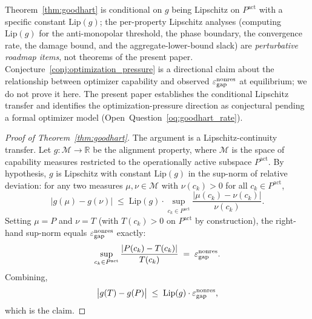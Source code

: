 \begin{remark}
\label{rem:thm2_qualitative}
Theorem~\ref{thm:goodhart} is conditional on $g$ being Lipschitz
on $P^{\mathrm{act}}$ with a specific constant $\mathrm{Lip}(g)$;
the per-property Lipschitz analyses (computing
$\mathrm{Lip}(g)$ for the anti-monopolar threshold, the phase
boundary, the convergence rate, the damage bound, and the
aggregate-lower-bound slack) are
\emph{perturbative roadmap items}, not theorems of the present
paper.  Conjecture~\ref{conj:optimization_pressure} is a
directional claim about the relationship between optimizer
capability and observed $\varepsilon_{\mathrm{gap}}^{\mathrm{nonres}}$ at equilibrium; we do not
prove it here.  The present paper establishes the conditional
Lipschitz transfer and identifies the optimization-pressure
direction as conjectural pending a formal optimizer model
(Open~Question~\ref{oq:goodhart_rate}).
\end{remark}

\begin{proof}[Proof of Theorem~\ref{thm:goodhart}]
The argument is a Lipschitz-continuity transfer.  Let
$g: \mathcal{M} \to \mathbb{R}$ be the alignment property, where
$\mathcal{M}$ is the space of capability measures restricted to
the operationally active subspace $P^{\mathrm{act}}$.  By
hypothesis, $g$ is Lipschitz with constant $\mathrm{Lip}(g)$ in
the sup-norm of relative deviation: for any two measures
$\mu, \nu \in \mathcal{M}$ with $\nu(c_k) > 0$ for all $c_k \in
P^{\mathrm{act}}$,
\[
  \bigl| g(\mu) - g(\nu) \bigr| \;\leq\;
  \mathrm{Lip}(g) \cdot \sup_{c_k \in P^{\mathrm{act}}}
  \frac{|\mu(c_k) - \nu(c_k)|}{\nu(c_k)}.
\]
Setting $\mu = P$ and $\nu = T$ (with $T(c_k) > 0$ on
$P^{\mathrm{act}}$ by construction), the right-hand sup-norm
equals $\varepsilon_{\mathrm{gap}}^{\mathrm{nonres}}$ exactly:
\[
  \sup_{c_k \in P^{\mathrm{act}}}
  \frac{|P(c_k) - T(c_k)|}{T(c_k)} \;=\; \varepsilon_{\mathrm{gap}}^{\mathrm{nonres}}.
\]
Combining,
\[
  \bigl| g(T) - g(P) \bigr| \;\leq\; \mathrm{Lip}(g) \cdot \varepsilon_{\mathrm{gap}}^{\mathrm{nonres}},
\]
which is the claim.
\end{proof}

